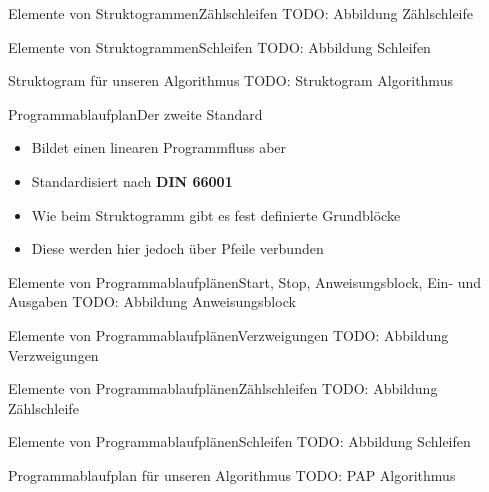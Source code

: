 \begin{frame}{Elemente von Struktogrammen}{Zählschleifen}
TODO: Abbildung Zählschleife
\end{frame}

\begin{frame}{Elemente von Struktogrammen}{Schleifen}
TODO: Abbildung Schleifen
\end{frame}

\begin{frame}{Struktogram für unseren Algorithmus}
TODO: Struktogram Algorithmus
\end{frame}

\begin{frame}{Programmablaufplan}{Der zweite Standard}
    \begin{itemize}
        \item Bildet einen linearen Programmfluss aber
        \item Standardisiert nach \textbf{DIN 66001}
        \item Wie beim Struktogramm gibt es fest definierte Grundblöcke
        \item Diese werden hier jedoch über Pfeile verbunden
    \end{itemize}
\end{frame}

\begin{frame}{Elemente von Programmablaufplänen}{Start, Stop, Anweisungsblock, Ein- und Ausgaben}
TODO: Abbildung Anweisungsblock
\end{frame}

\begin{frame}{Elemente von Programmablaufplänen}{Verzweigungen}
TODO: Abbildung Verzweigungen
\end{frame}

\begin{frame}{Elemente von Programmablaufplänen}{Zählschleifen}
TODO: Abbildung Zählschleife
\end{frame}

\begin{frame}{Elemente von Programmablaufplänen}{Schleifen}
TODO: Abbildung Schleifen
\end{frame}

\begin{frame}{Programmablaufplan für unseren Algorithmus}
TODO: PAP Algorithmus
\end{frame}

